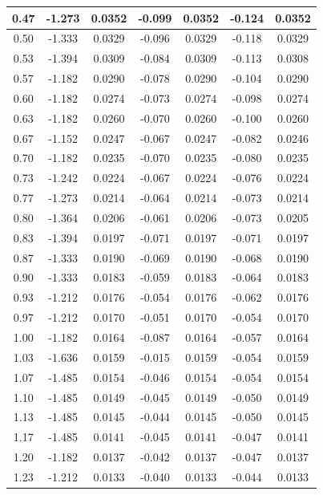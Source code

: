 \begin{longtable}{|c|c|c|c|c|c|c|}
    \hline 0.47 & -1.273 & 0.0352 & -0.099 & 0.0352 & -0.124 & 0.0352 \\
    \hline 0.50 & -1.333 & 0.0329 & -0.096 & 0.0329 & -0.118 & 0.0329 \\
    \hline 0.53 & -1.394 & 0.0309 & -0.084 & 0.0309 & -0.113 & 0.0308 \\
    \hline 0.57 & -1.182 & 0.0290 & -0.078 & 0.0290 & -0.104 & 0.0290 \\
    \hline 0.60 & -1.182 & 0.0274 & -0.073 & 0.0274 & -0.098 & 0.0274 \\
    \hline 0.63 & -1.182 & 0.0260 & -0.070 & 0.0260 & -0.100 & 0.0260 \\
    \hline 0.67 & -1.152 & 0.0247 & -0.067 & 0.0247 & -0.082 & 0.0246 \\
    \hline 0.70 & -1.182 & 0.0235 & -0.070 & 0.0235 & -0.080 & 0.0235 \\
    \hline 0.73 & -1.242 & 0.0224 & -0.067 & 0.0224 & -0.076 & 0.0224 \\
    \hline 0.77 & -1.273 & 0.0214 & -0.064 & 0.0214 & -0.073 & 0.0214 \\
    \hline 0.80 & -1.364 & 0.0206 & -0.061 & 0.0206 & -0.073 & 0.0205 \\
    \hline 0.83 & -1.394 & 0.0197 & -0.071 & 0.0197 & -0.071 & 0.0197 \\
    \hline 0.87 & -1.333 & 0.0190 & -0.069 & 0.0190 & -0.068 & 0.0190 \\
    \hline 0.90 & -1.333 & 0.0183 & -0.059 & 0.0183 & -0.064 & 0.0183 \\
    \hline 0.93 & -1.212 & 0.0176 & -0.054 & 0.0176 & -0.062 & 0.0176 \\
    \hline 0.97 & -1.212 & 0.0170 & -0.051 & 0.0170 & -0.054 & 0.0170 \\
    \hline 1.00 & -1.182 & 0.0164 & -0.087 & 0.0164 & -0.057 & 0.0164 \\
    \hline 1.03 & -1.636 & 0.0159 & -0.015 & 0.0159 & -0.054 & 0.0159 \\
    \hline 1.07 & -1.485 & 0.0154 & -0.046 & 0.0154 & -0.054 & 0.0154 \\
    \hline 1.10 & -1.485 & 0.0149 & -0.045 & 0.0149 & -0.050 & 0.0149 \\
    \hline 1.13 & -1.485 & 0.0145 & -0.044 & 0.0145 & -0.050 & 0.0145 \\
    \hline 1.17 & -1.485 & 0.0141 & -0.045 & 0.0141 & -0.047 & 0.0141 \\
    \hline 1.20 & -1.182 & 0.0137 & -0.042 & 0.0137 & -0.047 & 0.0137 \\
    \hline 1.23 & -1.212 & 0.0133 & -0.040 & 0.0133 & -0.044 & 0.0133 \\

\end{longtable}
